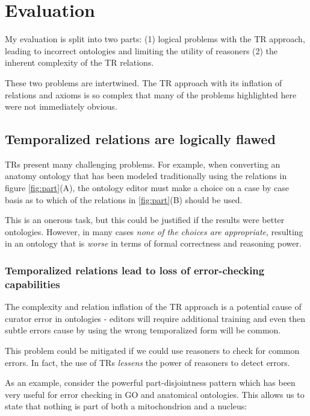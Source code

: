 \documentclass{bioinfo}
\begin{document}
\section{Evaluation}

My evaluation is split into two parts: (1) logical problems with the
TR approach, leading to incorrect ontologies and limiting the utility
of reasoners (2) the inherent complexity of the TR relations.

These two problems are intertwined. The TR approach with its inflation
of relations and axioms is so complex that many of the problems
highlighted here were not immediately obvious.

\subsection{Temporalized relations are logically flawed}

TRs present many challenging problems. For example, when converting an
anatomy ontology that has been modeled traditionally using the
relations in figure \ref{fig:part}(A), the ontology editor must make a
choice on a case by case basis as to which of the relations in
\ref{fig:part}(B) should be used.

This is an onerous task, but this could be justified if the results
were better ontologies. However, in many cases \emph{none of the
  choices are appropriate}, resulting in an ontology that is
\emph{worse} in terms of formal correctness and reasoning power.

\subsubsection{Temporalized relations lead to loss of error-checking
  capabilities}

The complexity and relation inflation of the TR approach is a
potential cause of curator error in ontologies - editors will require
additional training and even then subtle errors cause by using the
wrong temporalized form will be common.

This problem could be mitigated if we could use reasoners to check for
common errors. In fact, the use of TRs \emph{lessens} the power of
reasoners to detect errors.

As an example, consider the powerful part-disjointness
pattern\cite{PD} which has been very useful for error checking in GO
and anatomical ontologies. This allows us to state that nothing is
part of both a mitochondrion and a nucleus:
\end{document}
